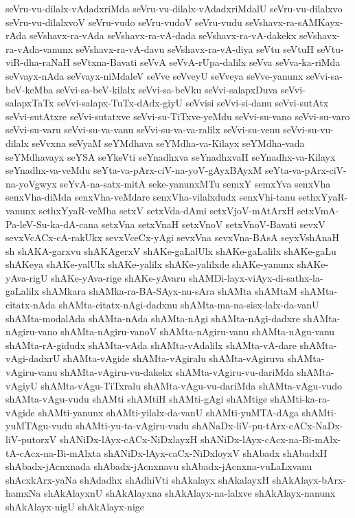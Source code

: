 {seVru-vu-dilalx-vAdadxriMda
seVru-vu-dilalx-vAdadxriMdalU
seVru-vu-dilalxvo
seVru-vu-dilalxvoV
seVru-vudo
seVru-vudoV
seVru-vudu
seVshavx-ra-sAMKayx-rAda
seVshavx-ra-vAda
seVshavx-ra-vA-dada
seVshavx-ra-vA-dakekx
seVshavx-ra-vAda-vanunx
seVshavx-ra-vA-davu
seVshavx-ra-vA-diya
seVtu
seVtuH
seVtu-viR-dha-raNaH
seVtxna-Bavati
seVvA
seVvA-rUpa-dalilx
seVva
seVva-ka-riMda
seVvayx-nAda
seVvayx-niMdaleV
seVve
seVveyU
seVveya
seVve-yanunx
seVvi-sa-beV-keMba
seVvi-sa-beV-kilalx
seVvi-sa-beVku
seVvi-salapxDuva
seVvi-salapxTaTx
seVvi-salapx-TuTx-dAdx-giyU
seVvisi
seVvi-si-danu
seVvi-sutAtx
seVvi-sutAtxre
seVvi-sutatxve
seVvi-su-TiTxve-yeMdu
seVvi-su-vano
seVvi-su-varo
seVvi-su-varu
seVvi-su-va-vanu
seVvi-su-va-va-ralilx
seVvi-su-venu
seVvi-su-vu-dilalx
seVvxna
seVyaM
seYMdhava
seYMdha-va-Kilayx
seYMdha-vada
seYMdhavayx
seYSA
seYkeVti
seYnadhxva
seYnadhxvaH
seYnadhx-va-Kilayx
seYnadhx-va-veMdu
seYta-va-pArx-ciV-na-yoV-gAyxBAyxM
seYta-va-pArx-ciV-na-yoVgwyx
seYvA-na-satx-mitA
seke-yanunxMTu
semxY
semxYva
senxVha
senxVha-diMda
senxVha-veMdare
senxVha-vilalxdudx
senxVhi-tanu
sethxYyaR-vanunx
sethxYyaR-veMba
setxV
setxVda-dAmi
setxVjoV-mAtArxH
setxVmA-Pa-leV-Su-ka-dA-cana
setxVna
setxVnaH
setxVnoV
setxVnoV-Bavati
sevxV
sevxVcACx-cA-rakUkx
sevxVceCx-yAgi
sevxVna
sevxVna-BAsA
seyxVshAnaH
sh
shAKA-garxvu
shAKAgerxV
shAKe-gaLalUlx
shAKe-gaLalilx
shAKe-gaLu
shAKeya
shAKe-yalUlx
shAKe-yalilx
shAKe-yalilxde
shAKe-yanunx
shAKe-yAva-rigU
shAKe-yAva-rige
shAKe-yAvaru
shAMDi-layx-viAyx-di-sathx-la-gaLalilx
shAMkara
shAMka-ra-BA-SAyx-nu-sAra
shAMta
shAMtaM
shAMta-citatx-nAda
shAMta-citatx-nAgi-dadxnu
shAMta-ma-na-sisx-lalx-da-vanU
shAMta-modalAda
shAMta-nAda
shAMta-nAgi
shAMta-nAgi-dadxre
shAMta-nAgiru-vano
shAMta-nAgiru-vanoV
shAMta-nAgiru-vanu
shAMta-nAgu-vanu
shAMta-rA-gidudx
shAMta-vAda
shAMta-vAdalilx
shAMta-vA-dare
shAMta-vAgi-dadxrU
shAMta-vAgide
shAMta-vAgiralu
shAMta-vAgiruva
shAMta-vAgiru-vanu
shAMta-vAgiru-vu-dakekx
shAMta-vAgiru-vu-dariMda
shAMta-vAgiyU
shAMta-vAgu-TiTxralu
shAMta-vAgu-vu-dariMda
shAMta-vAgu-vudo
shAMta-vAgu-vudu
shAMti
shAMtiH
shAMti-gAgi
shAMtige
shAMti-ka-ra-vAgide
shAMti-yanunx
shAMti-yilalx-da-vanU
shAMti-yuMTA-dAga
shAMti-yuMTAgu-vudu
shAMti-yu-ta-vAgiru-vudu
shANaDx-liV-pu-tArx-cACx-NaDx-liV-putorxV
shANiDx-lAyx-cACx-NiDxlayxH
shANiDx-lAyx-cAcx-na-Bi-mAlx-tA-cAcx-na-Bi-mAlxta
shANiDx-lAyx-caCx-NiDxloyxV
shAbadx
shAbadxH
shAbadx-jAcnxnada
shAbadx-jAcnxnavu
shAbadx-jAcnxna-vuLaLxvanu
shAcxkArx-yaNa
shAdadhx
shAdhiVti
shAkalayx
shAkalayxH
shAkAlayx-bArx-hamxNa
shAkAlayxnU
shAkAlayxna
shAkAlayx-na-lalxve
shAkAlayx-nanunx
shAkAlayx-nigU
shAkAlayx-nige
}
